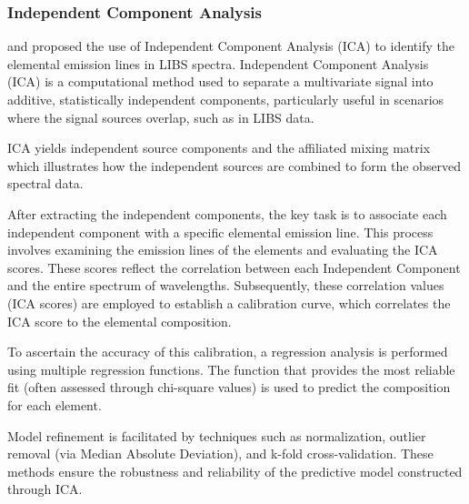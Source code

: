 \subsubsection{Independent Component Analysis}\label{sec:ica}
\citet{cleggRecalibrationMarsScience2017} and \cite{forniIndependentComponentAnalysis2013} proposed the use of Independent Component Analysis (ICA) to identify the elemental emission lines in LIBS spectra. Independent Component Analysis (ICA) is a computational method used to separate a multivariate signal into additive, statistically independent components, particularly useful in scenarios where the signal sources overlap, such as in LIBS data.

ICA yields independent source components and the affiliated mixing matrix which illustrates how the independent sources are combined to form the observed spectral data.

After extracting the independent components, the key task is to associate each independent component with a specific elemental emission line. 
This process involves examining the emission lines of the elements and evaluating the ICA scores. 
These scores reflect the correlation between each Independent Component and the entire spectrum of wavelengths. 
Subsequently, these correlation values (ICA scores) are employed to establish a calibration curve, which correlates the ICA score to the elemental composition.

To ascertain the accuracy of this calibration, a regression analysis is performed using multiple regression functions. The function that provides the most reliable fit (often assessed through chi-square values) is used to predict the composition for each element.

Model refinement is facilitated by techniques such as normalization, outlier removal (via Median Absolute Deviation), and k-fold cross-validation. These methods ensure the robustness and reliability of the predictive model constructed through ICA.